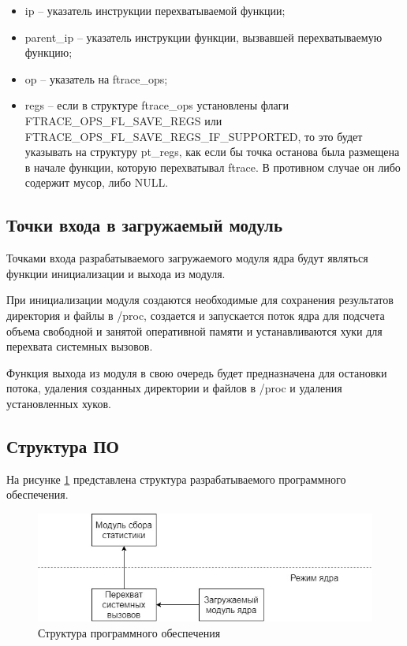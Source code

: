 \begin{itemize}
	\item ip -- указатель инструкции перехватываемой функции;
	
	\item parent\_ip -- указатель инструкции функции, вызвавшей перехватываемую функцию;
	
	\item op -- указатель на ftrace\_ops;
	
	\item regs -- если в структуре ftrace\_ops установлены флаги\\ FTRACE\_OPS\_FL\_SAVE\_REGS или\\ FTRACE\_OPS\_FL\_SAVE\_REGS\_IF\_SUPPORTED, то это будет указывать на структуру pt\_regs, как если бы точка останова была размещена в начале функции, которую перехватывал ftrace. В противном случае он либо содержит мусор, либо NULL.
\end{itemize}

\subsection{Точки входа в загружаемый модуль}

Точками входа разрабатываемого загружаемого модуля ядра будут являться функции инициализации и выхода из модуля.

При инициализации модуля создаются необходимые для сохранения результатов директория и файлы в /proc, создается и запускается поток ядра для подсчета объема свободной и занятой оперативной памяти и устанавливаются хуки для перехвата системных вызовов.

Функция выхода из модуля в свою очередь будет предназначена для остановки потока, удаления созданных директории и файлов в /proc и удаления установленных хуков.

\subsection{Структура ПО}

На рисунке \ref{fig:sw_structure} представлена структура разрабатываемого программного обеспечения.

\begin{figure}[h]
	\begin{center}
		\includegraphics[scale=0.75]{jpg/software_structure.jpg}
	\end{center}
	\caption{Структура программного обеспечения}
	\label{fig:sw_structure}
\end{figure}